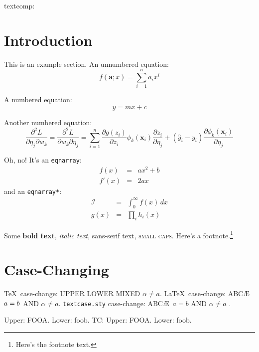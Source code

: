 \documentclass{article}
\newcommand*{\pfrac}[2]{\frac{\partial#1}{\partial#2}}
\newcommand*{\dpfrac}[3]{\frac{\partial^2#1}{\partial#2\partial#3}}
\renewcommand*{\vec}[1]{\boldsymbol{#1}}
\begin{document}

textcomp: \texttwosuperior\ \texteuro

\section{Introduction}
\label{sec:intro}

This is an example section. An unnumbered equation:
\[
  f(\vec{a}; x) = \sum_{i=1}^n a_i x^i
\]

A numbered equation:
\begin{equation}
y = m x + c
\label{eq:mx+c}
\end{equation}

Another numbered equation:
\begin{equation}\label{eq:dp}
 \dpfrac{L}{\eta_j}{w_k}
 = \dpfrac{L}{w_k}{\eta_j}
 = \sum_{i=1}^n \pfrac{g(z_i)}{z_i}
   \phi_k(\vec{x}_i)\pfrac{z_i}{\eta_j}
 + (\hat{y}_i - y_i)\pfrac{\phi_k(\vec{x}_i)}{\eta_j}
\end{equation}

Oh, no! It's an \texttt{eqnarray}:
\begin{eqnarray}
f(x) &=& ax^2 +b\label{eq:f}\\
f'(x) &=& 2ax\label{eq:df}
\end{eqnarray}
and an \texttt{eqnarray*}:
\begin{eqnarray*}
\mathcal{I} & = & \int_0^\infty f(x)\,dx\\
g(x) & = & \prod_i h_i(x)
\end{eqnarray*}

Some \textbf{bold text}, \textit{italic text}, 
\textsf{sans-serif text}, \textsc{small caps}.
Here's a footnote.\footnote{Here's the footnote text.}

\section{Case-Changing}
\label{sec:casechange}

\TeX\ case-change: \uppercase{upper \lowercase{LOWER} MiXeD $\alpha \neq a$.}
\LaTeX\ case-change: \MakeUppercase{abc\ae\ \protect\( a = b
\protect\) and $\alpha \neq a$}.
\texttt{textcase.sty} case-change: \MakeTextUppercase{abc\ae\ \( a = b \) and 
$\alpha \neq a$ }.

\newcommand{\foo}{fooa}
\newcommand{\FOO}{foob}
Upper: \uppercase{\foo}. Lower: \lowercase{\FOO}.
TC: Upper: \MakeTextUppercase{\foo}. Lower:
\MakeTextLowercase{\FOO}.
\end{document}
